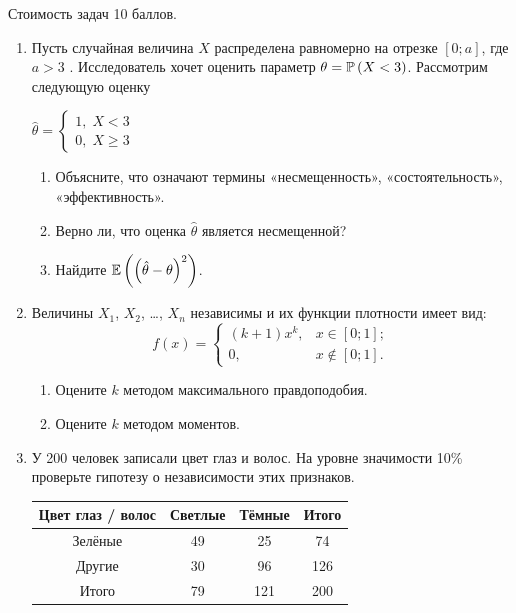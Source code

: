 Стоимость задач 10 баллов.

\begin{enumerate}
\item Пусть случайная величина  $X$  распределена
равномерно на отрезке $\left[0;a\right]$, где  $a>3$ .
Исследователь хочет оценить параметр  $\theta =\P\left(X<3\right)$. Рассмотрим следующую оценку

$\hat{\theta
}=\left\{\begin{array}{l} {1,\; X<3} \\ {0,\; X\ge 3}
\end{array}\right. $
\begin{enumerate}
\item Объясните, что означают термины «несмещенность»,
«состоятельность», «эффективность».
\item Верно ли, что оценка $\hat{\theta}$ является несмещенной?
\item Найдите $\E\left(\left(\hat{\theta }-\theta \right)^{2} \right)$.
\end{enumerate}

\item Величины $X_{1}$, $X_{2}$, \ldots, $X_{n}$ независимы и их функции
плотности имеет вид:
\[
f(x)=
\begin{cases}
    (k+1)x^{k}, & x \in [0;1]; \\
    0, & x \notin [0;1].
\end{cases}
\]

\begin{enumerate}
\item Оцените $k$ методом максимального правдоподобия.
\item Оцените $k$ методом моментов.
\end{enumerate}

\item У 200 человек записали цвет глаз и волос. На уровне значимости
10\% проверьте гипотезу о независимости этих признаков.

\begin{center}
\begin{tabular}{@{}cccc@{}}
\toprule
Цвет глаз / волос & Светлые & Тёмные & Итого \\ \midrule
Зелёные           & 49      & 25     & 74    \\
Другие            & 30      & 96     & 126   \\ \midrule
Итого             & 79      & 121    & 200   \\ \bottomrule
\end{tabular}
\end{center}


\end{enumerate}
